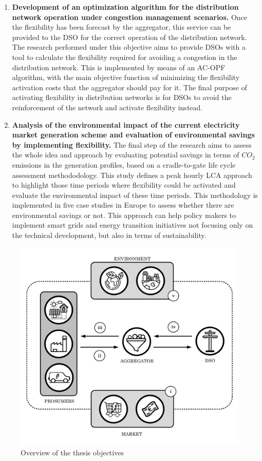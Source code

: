 \begin{enumerate}
\item \textbf{Development of an optimization algorithm for the distribution network operation under congestion management scenarios.} Once the flexibility has been forecast by the aggregator, this service can be provided to the DSO for the correct operation of the distribution network. The research performed under this objective aims to provide DSOs with a tool to calculate the flexibility required for avoiding a congestion in the distribution network. This is implemented by means of an AC-OPF algorithm, with the main objective function of minimizing the flexibility activation costs that the aggregator should pay for it. The final purpose of activating flexibility in distribution networks is for DSOs to avoid the reinforcement of the network and activate flexibility instead. 
\item \textbf{Analysis of the environmental impact of the current electricity market generation scheme and evaluation of environmental savings by implementing flexibility.} The final step of the research aims to assess the whole idea and approach by evaluating potential savings in terms of $CO_2$ emissions in the generation profiles, based on a cradle-to-gate life cycle assessment methododology. This study defines a peak hourly LCA approach to highlight those time periods where flexibility could be activated and evaluate the environmental impact of these time periods. This methodology is implemented in five case studies in Europe to assess whether there are environmental savings or not. This approach can help policy makers to implement smart grids and energy transition initiatives not focusing only on the technical development, but also in terms of sustainability. 
\end{enumerate} 

\begin{figure}[h]
	\centering 
	\includegraphics[width=0.75\columnwidth ]{ChapterIntro/Figures/objectives_figure_2.pdf}
		\caption{Overview of the thesis objectives}  
		\label{fig:objectives}
\end{figure}



